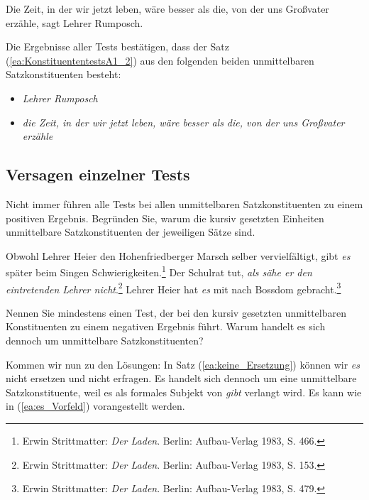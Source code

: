 \ea \label{ea:Voranstellung_K2_1} Die Zeit, in der wir jetzt leben, wäre besser als die, von der uns Großvater erzähle, sagt Lehrer Rumposch.  
\z 

Die Ergebnisse aller Tests bestätigen, dass der Satz (\ref{ea:KonstituententestsA1_2}) aus den folgenden beiden unmittelbaren Satzkonstituenten besteht: 

\begin{itemize}

\item \textit{Lehrer Rumposch}

\item \textit{die Zeit, in der wir jetzt leben, wäre besser als die, von der uns Großvater erzähle}

\end{itemize}



\subsection{Versagen einzelner Tests}\label{subsection:A_Konstituenz2}

Nicht immer führen alle Tests bei allen unmittelbaren Satzkonstituenten zu einem positiven Ergebnis. Begründen Sie, warum die kursiv gesetzten Einheiten unmittelbare Satzkonstituenten der jeweiligen Sätze sind.

\ea \label{ea:Testversagen}
\ea \label{ea:keine_Ersetzung} Obwohl Lehrer Heier den Hohenfriedberger Marsch selber vervielfältigt, gibt \textit{es} später beim Singen Schwierigkeiten.\footnote{Erwin Strittmatter: \textit{Der Laden}. Berlin: Aufbau-Verlag 1983, S. 466.} 
\ex \label{ex:keine_Voranstellung} Der Schulrat tut, \textit{als sähe er den eintretenden Lehrer nicht}.\footnote{Erwin Strittmatter: \textit{Der Laden}. Berlin: Aufbau-Verlag 1983, S. 153.}
\ex \label{ex:keine_Voranstellung2} Lehrer Heier hat \textit{es} mit nach Bossdom gebracht.\footnote{Erwin Strittmatter: \textit{Der Laden}. Berlin: Aufbau-Verlag 1983, S. 479.}
\z 
\z 

Nennen Sie mindestens einen Test, der bei den kursiv gesetzten unmittelbaren Konstituenten zu einem negativen Ergebnis führt. Warum handelt es sich dennoch um unmittelbare Satzkonstituenten?


Kommen wir nun zu den Lösungen: In Satz (\ref{ea:keine_Ersetzung}) können wir \textit{es} nicht ersetzen und nicht erfragen. Es handelt sich dennoch um eine unmittelbare Satzkonstituente, weil es als formales Subjekt von \textit{gibt} verlangt wird. Es kann wie in (\ref{ea:es_Vorfeld}) vorangestellt werden.

